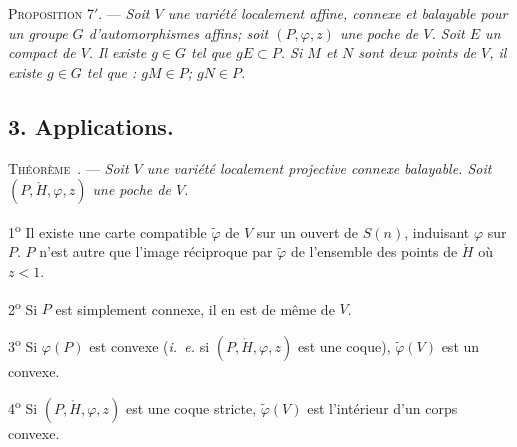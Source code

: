 \documentclass[11pt]{article}
\newcommand{\bznum}[1]{\if\relax\detokenize{#1}\relax\else\ #1\fi}
\newenvironment{prop}[1][]{\par\medskip\noindent\textsc{Proposition #1.} --- \itshape}{\par\medskip}
\newenvironment{theoreme}[1][]{\par\medskip\noindent\textsc{Théorème\bznum{#1}.} --- \itshape}{\par\medskip}
\begin{document}
\begin{prop}[7$'$]
Soit $V$ une variété localement affine, connexe et balayable pour un groupe $G$ d'automorphismes
affins; soit $(P, \varphi, z)$ une poche de $V$. Soit $E$ un compact de $V$. Il existe $g\in G$
tel que $gE\subset P$. Si $M$ et $N$ sont deux points de $V$, il existe $g\in G$ tel que :
$gM\in P$; $gN\in P$.
\end{prop}

\subsection*{3. Applications.}

\begin{theoreme}
Soit $V$ une variété localement projective connexe balayable. Soit $(P, \mathring{H}, \varphi, z)$
une poche de $V$.

1\textsuperscript{o} Il existe une carte compatible $\tilde{\varphi}$ de $V$ sur un ouvert de
$S(n)$, induisant $\varphi$ sur $P$. $P$ n'est autre que l'image réciproque par $\tilde{\varphi}$
de l'ensemble des points de $\mathring{H}$ où $z<1$.

2\textsuperscript{o} Si $P$ est simplement connexe, il en est de même de $V$.

3\textsuperscript{o} Si $\varphi(P)$ est convexe (\textit{i.~e.} si $(P, \mathring{H}, \varphi,
z)$ est une coque), $\tilde{\varphi}(V)$ est un convexe.

4\textsuperscript{o} Si $(P, \mathring{H}, \varphi, z)$ est une coque stricte,
$\tilde{\varphi}(V)$ est l'intérieur d'un corps convexe.
\end{theoreme}
\end{document}
